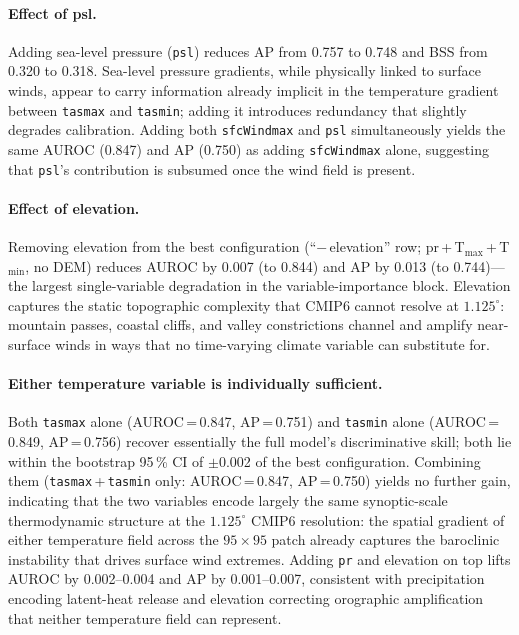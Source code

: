 \documentclass{article}
\begin{document}
\paragraph{Effect of psl.}
Adding sea-level pressure (\texttt{psl}) reduces AP from 0.757 to 0.748 and BSS from 0.320 to 0.318. Sea-level pressure gradients, while physically linked to surface winds, appear to carry information already implicit in the temperature gradient between \texttt{tasmax} and \texttt{tasmin}; adding it introduces redundancy that slightly degrades calibration. Adding both \texttt{sfcWindmax} and \texttt{psl} simultaneously yields the same AUROC (0.847) and AP (0.750) as adding \texttt{sfcWindmax} alone, suggesting that \texttt{psl}'s contribution is subsumed once the wind field is present.

\paragraph{Effect of elevation.}
Removing elevation from the best configuration (``$-$\,elevation'' row; pr\,+\,T$_\text{max}$\,+\,T$_\text{min}$, no DEM) reduces AUROC by 0.007 (to 0.844) and AP by 0.013 (to 0.744)---the largest single-variable degradation in the variable-importance block. Elevation captures the static topographic complexity that CMIP6 cannot resolve at $1.125^\circ$: mountain passes, coastal cliffs, and valley constrictions channel and amplify near-surface winds in ways that no time-varying climate variable can substitute for.

\paragraph{Either temperature variable is individually sufficient.}
Both \texttt{tasmax} alone (AUROC\,=\,0.847, AP\,=\,0.751) and \texttt{tasmin} alone (AUROC\,=\,0.849, AP\,=\,0.756) recover essentially the full model's discriminative skill; both lie within the bootstrap 95\,\% CI of $\pm$0.002 of the best configuration. Combining them (\texttt{tasmax}\,+\,\texttt{tasmin} only: AUROC\,=\,0.847, AP\,=\,0.750) yields no further gain, indicating that the two variables encode largely the same synoptic-scale thermodynamic structure at the $1.125^\circ$ CMIP6 resolution: the spatial gradient of either temperature field across the $95{\times}95$ patch already captures the baroclinic instability that drives surface wind extremes. Adding \texttt{pr} and elevation on top lifts AUROC by 0.002--0.004 and AP by 0.001--0.007, consistent with precipitation encoding latent-heat release and elevation correcting orographic amplification that neither temperature field can represent.
\end{document}
